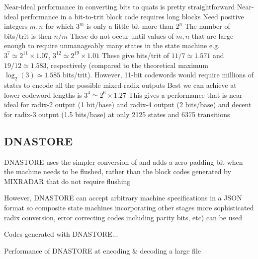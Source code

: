 \documentclass[english]{article}
\begin{document}
Near-ideal performance in converting bits to quats is pretty straightforward
Near-ideal performance in a bit-to-trit block code requires long blocks
Need positive integers $m,n$ for which $3^m$ is only a little bit more than $2^n$
The number of bits/trit is then $n/m$
These do not occur until values of $m,n$ that are large enough to require unmanageably many states in the state machine
e.g. $3^7 \simeq 2^{11} \times 1.07$, $3^{12} \simeq 2^{19} \times 1.01$
These give bits/trit of $11/7 \simeq 1.571$ and $19/12 \simeq 1.583$, respectively
(compared to the theoretical maximum $\log_2(3) \simeq 1.585$ bits/trit).
However, 11-bit codewords would require millions of states to encode all the possible mixed-radix outputs
Best we can achieve at lower codeword-lengths is $3^4 \simeq 2^6 \times 1.27$
This gives a performance that is near-ideal for radix-2 output (1 bit/base) and radix-4 output (2 bits/base)
and decent for radix-3 output (1.5 bits/base)
at only 2125 states and 6375 transitions

%



\subsection{DNASTORE}

DNASTORE uses the simpler conversion of
 and adds a zero padding bit when the machine needs to be flushed,
rather than the block codes generated by MIXRADAR that do not require flushing

However, DNASTORE can accept arbitrary machine specifications in a JSON format
so composite state machines incorporating other stages
more sophisticated radix conversion, error correcting codes including parity bits, etc)
can be used

Codes generated with DNASTORE...


Performance of DNASTORE at encoding \& decoding a large file
\end{document}
